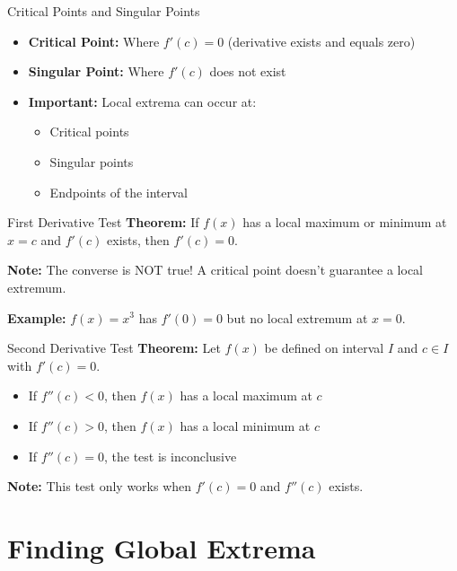 \documentclass[aspectratio=169]{beamer}
\begin{document}
\begin{frame}{Critical Points and Singular Points}
\begin{itemize}
    \item \textbf{Critical Point:} Where $f'(c) = 0$ (derivative exists and equals zero)
    \item \textbf{Singular Point:} Where $f'(c)$ does not exist
    \item \textbf{Important:} Local extrema can occur at:
    \begin{itemize}
        \item Critical points
        \item Singular points
        \item Endpoints of the interval
    \end{itemize}
\end{itemize}
\end{frame}

\begin{frame}{First Derivative Test}
\textbf{Theorem:} If $f(x)$ has a local maximum or minimum at $x = c$ and $f'(c)$ exists, then $f'(c) = 0$.

\textbf{Note:} The converse is NOT true! A critical point doesn't guarantee a local extremum.

\textbf{Example:} $f(x) = x^3$ has $f'(0) = 0$ but no local extremum at $x = 0$.
\end{frame}

\begin{frame}{Second Derivative Test}
\textbf{Theorem:} Let $f(x)$ be defined on interval $I$ and $c \in I$ with $f'(c) = 0$.

\begin{itemize}
    \item If $f''(c) < 0$, then $f(x)$ has a local maximum at $c$
    \item If $f''(c) > 0$, then $f(x)$ has a local minimum at $c$
    \item If $f''(c) = 0$, the test is inconclusive
\end{itemize}

\textbf{Note:} This test only works when $f'(c) = 0$ and $f''(c)$ exists.
\end{frame}

\section{Finding Global Extrema}
\end{document}
